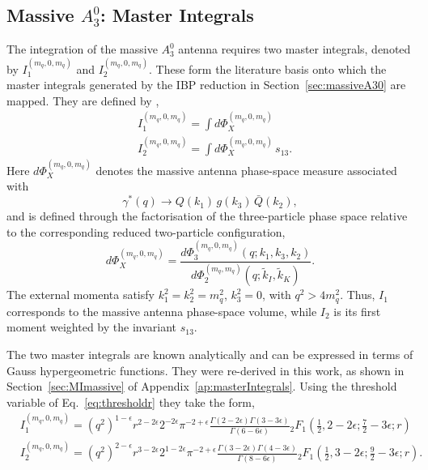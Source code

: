 \subsection{Massive $A_3^0$: Master Integrals}\label{subsec:massiveMI}

The integration of the massive $A_3^0$ antenna requires two master integrals, denoted by
$I_1^{(m_q,0,m_q)}$ and $I_2^{(m_q,0,m_q)}$. These form the literature basis onto which the
master integrals generated by the IBP reduction in Section~\ref{sec:massiveA30} are mapped. They
are defined by \cite{GehrmannDeRidder:2009fz},
\begin{equation}
    \begin{split}
        &I_1^{(m_q,0,m_q)} = \int d\Phi_X^{(m_q,0,m_q)}\\
        &I_2^{(m_q,0,m_q)} = \int d\Phi_X^{(m_q,0,m_q)}\,s_{13}.
    \end{split}
\end{equation}
Here $d\Phi_X^{(m_q,0,m_q)}$ denotes the massive antenna phase-space measure associated with
\begin{equation*}
    \gamma^*(q)\rightarrow Q(k_1)\,g(k_3)\,\bar Q(k_2),
\end{equation*}
and is defined through the factorisation of the three-particle phase space relative to the
corresponding reduced two-particle configuration,
\begin{equation}
    d\Phi_X^{(m_q,0,m_q)} = \frac{d\Phi_3^{(m_q,0,m_q)}(q;k_1,k_3,k_2)}{d\Phi_2^{(m_q,m_q)}(q;\tilde k_I, \tilde k_K)}.
\end{equation}
The external momenta satisfy $k_1^2=k_2^2=m_q^2$, $k_3^2=0$, with $q^2>4m_q^2$. Thus, $I_1$
corresponds to the massive antenna phase-space volume, while $I_2$ is its first moment weighted
by the invariant $s_{13}$.

The two master integrals are known analytically \cite{GehrmannDeRidder:2009fz} and can be
expressed in terms of Gauss hypergeometric functions. They were re-derived in this work, as shown in
Section~\ref{sec:MImassive} of Appendix~\ref{ap:masterIntegrals}. Using the threshold variable of
Eq.~\eqref{eq:thresholdr} they take the form,
\begin{equation}
    \begin{split}
        &I_1^{(m_q,0,m_q)} = \left(q^2\right)^{1-\epsilon}r^{2-2\epsilon}2^{-2\epsilon}\pi^{-2+\epsilon}\frac{\Gamma(2-2\epsilon)\Gamma(3-3\epsilon)}{\Gamma(6-6\epsilon)}{}_2F_1\!\left(\frac12,2-2\epsilon;\frac72-3\epsilon;r\right)\\
        &I_2^{(m_q,0,m_q)} = \left(q^2\right)^{2-\epsilon}r^{3-2\epsilon}2^{1-2\epsilon}\pi^{-2+\epsilon}\frac{\Gamma(3-2\epsilon)\Gamma(4-3\epsilon)}{\Gamma(8-6\epsilon)}{}_2F_1\!\left(\frac12,3-2\epsilon;\frac92-3\epsilon;r\right).
    \end{split}
\end{equation}

